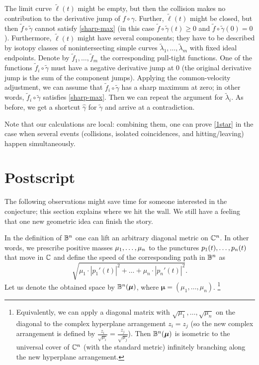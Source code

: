 \documentclass[a4paper,10pt]{article}
\begin{document}
The limit curve $\tilde\ell(t)$ might be empty, but then the collision makes no contribution to the derivative jump of $f\circ\gamma$.
Further, $\tilde\ell(t)$ might be closed, but then $\tilde f\circ \tilde\gamma$ cannot satisfy \ref{sharp-max} (in this case $\tilde f\circ \tilde\gamma(t)\ge0$ and $\tilde f\circ \tilde\gamma(0)=0$).
Furthermore, $\tilde\ell(t)$ might have several components;
they have to be described by isotopy classes of nonintersecting simple curves $\tilde\lambda_1,\ldots,\tilde\lambda_m$ with fixed ideal endpoints.
Denote by $\tilde f_1,\dots,\tilde f_m$ the corresponding pull-tight functions.
One of the functions $\tilde f_i\circ\tilde\gamma$ must have a negative derivative jump at $0$ (the original derivative jump is the sum of the component jumps).
Applying the common-velocity adjustment, we can assume that $\tilde f_i\circ\tilde\gamma$
has a sharp maximum at zero; in other words, $\tilde f_i\circ\tilde\gamma$ satisfies \ref{sharp-max}.
Then we can repeat the argument for $\tilde\lambda_i$.
As before, we get a shortcut $\hat\gamma$ for $\tilde \gamma$ and arrive at a contradiction.

 Note that our calculations are local: combining them, one can prove \ref{1star} in the case when several events (collisions, isolated coincidences, and hitting/leaving) happen simultaneously.
\qeds

\section{Postscript}

The following observations might save time for someone interested in the conjecture;
this section explains where we hit the wall.
We still have a feeling that one new geometric idea can finish the story.

In the definition of $\mathbb{B}^n$ one can lift an arbitrary diagonal metric on $\mathbb{C}^n$.
In other words, we prescribe positive masses $\mu_1,\z\ldots,\mu_n$ to the punctures $p_1(t),\z\ldots, p_n(t)$ that move in $\mathbb{C}$ and define the speed of the corresponding path in $\mathbb{B}^n$ as
\[\sqrt{\mu_1\cdot|p_1'(t)|^2+\ldots+ \mu_n\cdot|p_n'(t)|^2}.\]
Let us denote the obtained space by $\mathbb{B}^n(\bm{\mu})$, where $\bm{\mu}=(\mu_1,\ldots,\mu_n)$.%
\footnote{Equivalently, we can apply a diagonal matrix with $\sqrt{\mu_1},\ldots,\sqrt{\mu_n}$ on the diagonal to the complex hyperplane arrangement $z_i=z_j$ (so the new complex arrangement is defined by $\frac{z_i}{\sqrt{\mu_i}}=\frac{z_j}{\sqrt{\mu_j}}$).
Then $\mathbb{B}^n(\bm{\mu})$ is isometric to the universal cover of $\mathbb{C}^n$ (with the standard metric) infinitely branching along the new hyperplane arrangement.}
\end{document}
